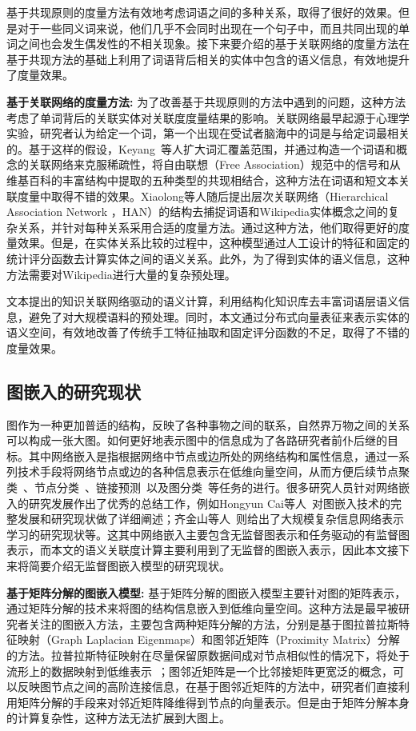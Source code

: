 基于共现原则的度量方法有效地考虑词语之间的多种关系，取得了很好的效果。但是对于一些同义词来说，他们几乎不会同时出现在一个句子中，而且共同出现的单词之间也会发生偶发性的不相关现象。接下来要介绍的基于关联网络的度量方法在基于共现方法的基础上利用了词语背后相关的实体中包含的语义信息，有效地提升了度量效果。

\textbf{基于关联网络的度量方法:}
为了改善基于共现原则的方法中遇到的问题，这种方法考虑了单词背后的关联实体对关联度度量结果的影响。关联网络最早起源于心理学实验，研究者认为给定一个词，第一个出现在受试者脑海中的词是与给定词最相关的。基于这样的假设，Keyang~\cite{aaai/ZhangZH15}等人扩大词汇覆盖范围，并通过构造一个词语和概念的关联网络来克服稀疏性，将自由联想（Free Association）规范中的信号和从维基百科的丰富结构中提取的五种类型的共现相结合，这种方法在词语和短文本关联度量中取得不错的效果。Xiaolong\cite{aaai/GongXH18}等人随后提出层次关联网络（Hierarchical Association Network ，HAN）的结构去捕捉词语和Wikipedia实体概念之间的复杂关系，并针对每种关系采用合适的度量方法。通过这种方法，他们取得更好的度量效果。但是，在实体关系比较的过程中，这种模型通过人工设计的特征和固定的统计评分函数去计算实体之间的语义关系。此外，为了得到实体的语义信息，这种方法需要对Wikipedia进行大量的复杂预处理。

文本提出的知识关联网络驱动的语义计算，利用结构化知识库去丰富词语层语义信息，避免了对大规模语料的预处理。同时，本文通过分布式向量表征来表示实体的语义空间，有效地改善了传统手工特征抽取和固定评分函数的不足，取得了不错的度量效果。

\subsection{图嵌入的研究现状}
图作为一种更加普适的结构，反映了各种事物之间的联系，自然界万物之间的关系可以构成一张大图。如何更好地表示图中的信息成为了各路研究者前仆后继的目标。其中网络嵌入是指根据网络中节点或边所处的网络结构和属性信息，通过一系列技术手段将网络节点或边的各种信息表示在低维向量空间，从而方便后续节点聚类~\cite{aaai/NieZL17}、节点分类~\cite{aaai/WangCWP0Y17}、链接预测~\cite{www/WeiXCY17}以及图分类~\cite{nips/DefferrardBV16}等任务的进行。很多研究人员针对网络嵌入的研究发展作出了优秀的总结工作，例如Hongyun Cai等人~\cite{tkde/CaiZC18}对图嵌入技术的完整发展和研究现状做了详细阐述；齐金山等人~\cite{qijinshan2018}则给出了大规模复杂信息网络表示学习的研究现状等。这其中网络嵌入主要包含无监督图表示和任务驱动的有监督图表示，而本文的语义关联度计算主要利用到了无监督的图嵌入表示，因此本文接下来将简要介绍无监督图嵌入模型的研究现状。

\textbf{基于矩阵分解的图嵌入模型:}
基于矩阵分解的图嵌入模型主要针对图的矩阵表示，通过矩阵分解的技术来将图的结构信息嵌入到低维向量空间。这种方法是最早被研究者关注的图嵌入方法，主要包含两种矩阵分解的方法，分别是基于图拉普拉斯特征映射（Graph Laplacian Eigenmaps）和图邻近矩阵（Proximity Matrix）分解的方法。拉普拉斯特征映射在尽量保留原数据间成对节点相似性的情况下，将处于流形上的数据映射到低维表示~\cite{nips/HofmannB94, nips/HeN03, mm/CaiHH07}；图邻近矩阵是一个比邻接矩阵更宽泛的概念，可以反映图节点之间的高阶连接信息，在基于图邻近矩阵的方法中，研究者们直接利用矩阵分解的手段来对邻近矩阵降维得到节点的向量表示\cite{NM/Golub70, nips/HofmannB94}。但是由于矩阵分解本身的计算复杂性，这种方法无法扩展到大图上。

